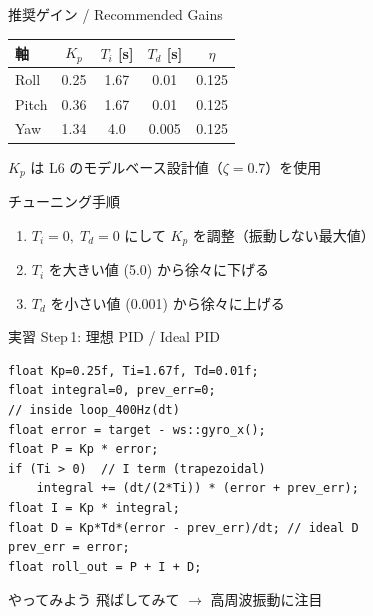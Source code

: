 \begin{frame}{推奨ゲイン / Recommended Gains}
  \begin{table}
    \centering
    \begin{tabular}{lcccc}
      \hline
      \textbf{軸} & \textbf{$K_p$} & \textbf{$T_i$ [s]} & \textbf{$T_d$ [s]} & \textbf{$\eta$} \\
      \hline
      Roll  & 0.25 & 1.67 & 0.01  & 0.125 \\
      Pitch & 0.36 & 1.67 & 0.01  & 0.125 \\
      Yaw   & 1.34 & 4.0  & 0.005 & 0.125 \\
      \hline
    \end{tabular}
  \end{table}

  \vspace{0.3em}

  {\small $K_p$ は L6 のモデルベース設計値（$\zeta = 0.7$）を使用}

  \vspace{0.3em}

  \begin{block}{チューニング手順}
    \begin{enumerate}
      \item $T_i{=}0,\; T_d{=}0$ にして $K_p$ を調整（振動しない最大値）
      \item $T_i$ を大きい値 (5.0) から徐々に下げる
      \item $T_d$ を小さい値 (0.001) から徐々に上げる
    \end{enumerate}
  \end{block}
\end{frame}

\begin{frame}[fragile]{実習 Step\,1: 理想 PID / Ideal PID}
  \begin{lstlisting}[style=sfcpp, title={user\_code.cpp (roll axis excerpt)}]
float Kp=0.25f, Ti=1.67f, Td=0.01f;
float integral=0, prev_err=0;
// inside loop_400Hz(dt)
float error = target - ws::gyro_x();
float P = Kp * error;
if (Ti > 0)  // I term (trapezoidal)
    integral += (dt/(2*Ti)) * (error + prev_err);
float I = Kp * integral;
float D = Kp*Td*(error - prev_err)/dt; // ideal D
prev_err = error;
float roll_out = P + I + D;
  \end{lstlisting}

  \begin{exampleblock}{やってみよう}
    飛ばしてみて $\to$ 高周波振動に注目
  \end{exampleblock}
\end{frame}

